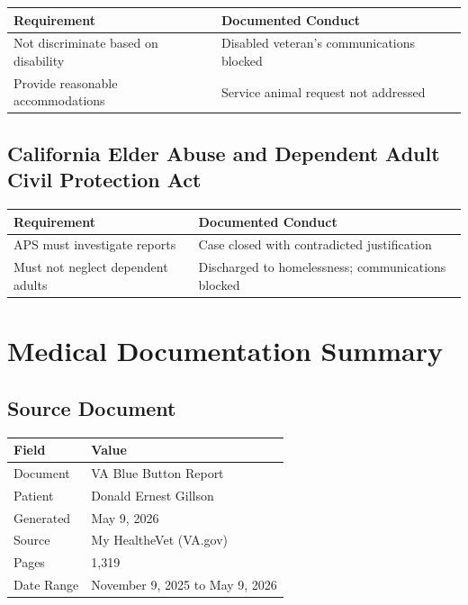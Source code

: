 \documentclass[12pt,letterpaper]{article}
\begin{document}
\begin{center}
\begin{tabular}{ll}
\toprule
\textbf{Requirement} & \textbf{Documented Conduct} \\
\midrule
Not discriminate based on disability & Disabled veteran's communications blocked \\
Provide reasonable accommodations & Service animal request not addressed \\
\bottomrule
\end{tabular}
\end{center}

\subsection{California Elder Abuse and Dependent Adult Civil Protection Act}

\begin{center}
\begin{tabular}{ll}
\toprule
\textbf{Requirement} & \textbf{Documented Conduct} \\
\midrule
APS must investigate reports & Case closed with contradicted justification \\
Must not neglect dependent adults & Discharged to homelessness; communications blocked \\
\bottomrule
\end{tabular}
\end{center}

\newpage

\section{Medical Documentation Summary}

\subsection{Source Document}

\begin{center}
\begin{tabular}{ll}
\toprule
\textbf{Field} & \textbf{Value} \\
\midrule
Document & VA Blue Button Report \\
Patient & Donald Ernest Gillson \\
Generated & May 9, 2026 \\
Source & My HealtheVet (VA.gov) \\
Pages & 1,319 \\
Date Range & November 9, 2025 to May 9, 2026 \\
\bottomrule
\end{tabular}
\end{center}
\end{document}
